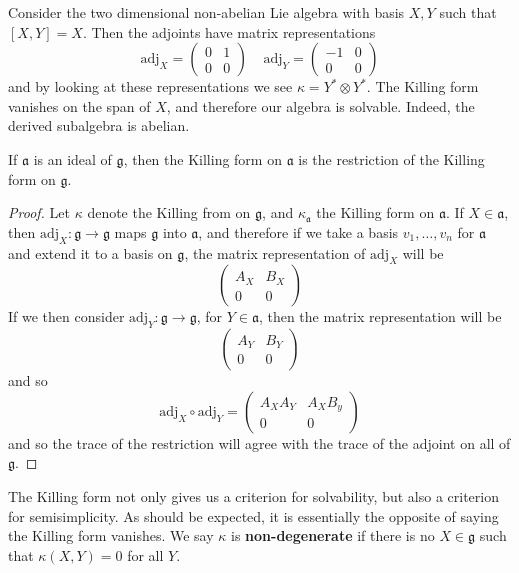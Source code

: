 \begin{example}
    Consider the two dimensional non-abelian Lie algebra with basis $X,Y$ such that $[X,Y] = X$. Then the adjoints have matrix representations
    \[ \text{adj}_X = \begin{pmatrix} 0 & 1 \\ 0 & 0 \end{pmatrix}\ \ \ \ \ \text{adj}_Y = \begin{pmatrix} -1 & 0 \\ 0 & 0 \end{pmatrix} \]
    and by looking at these representations we see $\kappa = Y^* \otimes Y^*$. The Killing form vanishes on the span of $X$, and therefore our algebra is solvable. Indeed, the derived subalgebra is abelian.
\end{example}

\begin{lemma}
    If $\mathfrak{a}$ is an ideal of $\mathfrak{g}$, then the Killing form on $\mathfrak{a}$ is the restriction of the Killing form on $\mathfrak{g}$.
\end{lemma}
\begin{proof}
    Let $\kappa$ denote the Killing from on $\mathfrak{g}$, and $\kappa_\mathfrak{a}$ the Killing form on $\mathfrak{a}$. If $X \in \mathfrak{a}$, then $\text{adj}_X: \mathfrak{g} \to \mathfrak{g}$ maps $\mathfrak{g}$ into $\mathfrak{a}$, and therefore if we take a basis $v_1, \dots, v_n$ for $\mathfrak{a}$ and extend it to a basis on $\mathfrak{g}$, the matrix representation of $\text{adj}_X$ will be
    \[ \begin{pmatrix} A_X & B_X \\ 0 & 0 \end{pmatrix} \]
    If we then consider $\text{adj}_Y: \mathfrak{g} \to \mathfrak{g}$, for $Y \in \mathfrak{a}$, then the matrix representation will be
    \[ \begin{pmatrix} A_Y & B_Y \\ 0 & 0 \end{pmatrix} \]
    and so
    \[ \text{adj}_X \circ \text{adj}_Y = \begin{pmatrix} A_XA_Y & A_XB_y \\ 0 & 0 \end{pmatrix} \]
    and so the trace of the restriction will agree with the trace of the adjoint on all of $\mathfrak{g}$.
\end{proof}

The Killing form not only gives us a criterion for solvability, but also a criterion for semisimplicity. As should be expected, it is essentially the opposite of saying the Killing form vanishes. We say $\kappa$ is {\bf non-degenerate} if there is no $X \in \mathfrak{g}$ such that $\kappa(X,Y) = 0$ for all $Y$.

